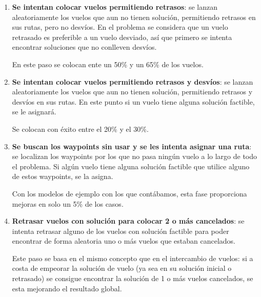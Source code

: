 \begin{enumerate}
	\item \textbf{Se intentan colocar vuelos permitiendo retrasos}: se lanzan aleatoriamente los vuelos que aun no tienen solución, permitiendo retrasos en sus rutas, pero no desvíos.	En el problema se considera que un vuelo retrasado es preferible a un vuelo desviado, así que primero se intenta encontrar soluciones que no conlleven desvíos.
	
	En este paso se colocan ente un 50\% y un 65\% de los vuelos.
	
	\item \textbf{Se intentan colocar vuelos permitiendo retrasos y desvíos}: se lanzan aleatoriamente los vuelos que aun no tienen solución, permitiendo retrasos y desvíos en sus rutas. En este punto si un vuelo tiene alguna solución factible, se le asignará. 
	
	Se colocan con éxito entre el 20\% y el 30\%.
	
	\item \textbf{Se buscan los waypoints sin usar y se les intenta asignar una ruta}: se localizan los waypoints por los que no pasa ningún vuelo a lo largo de todo el problema. Si algún vuelo tiene alguna solución factible que utilice alguno de estos waypoints, se la asigna. 
	
	Con los modelos de ejemplo con los que contábamos, esta fase proporciona mejoras en solo un 5\% de los casos.
	
	\item \textbf{Retrasar vuelos con solución para colocar 2 o más cancelados}: se intenta retrasar alguno de los vuelos con solución factible para poder encontrar de forma aleatoria uno o más vuelos que estaban cancelados.
	
	Este paso se basa en el mismo concepto que en el intercambio de vuelos: si a costa de empeorar la solución de vuelo (ya sea en su solución inicial o retrasado) se consigue encontrar la solución de 1 o más vuelos cancelados, se esta mejorando el resultado global.
	
\end{enumerate}
